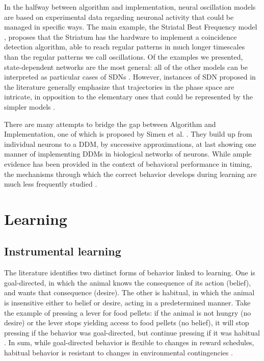     In the halfway between algorithm and implementation, neural oscillation models are based on experimental data regarding neuronal activity that could be managed in specific ways. The main example, the Striatal Beat Frequency model \cite{mello2015scalable}, proposes that the Striatum has the hardware to implement a coincidence detection algorithm, able to reach regular patterns in much longer timescales than the regular patterns we call oscillations. Of the examples we presented, state-dependent networks are the most general: all of the other models can be interpreted as particular cases of SDNs \cite{hass2014neurocomputational}. However, instances of SDN proposed in the literature generally emphasize that trajectories in the phase space are intricate, in opposition to the elementary ones that could be represented by the simpler models \cite{buonomano2009state}.

    There are many attempts to bridge the gap between Algorithm and Implementation, one of which is proposed by Simen et al. \cite{simen2011model}. They build up from individual neurons to a DDM, by successive approximations, at last showing one manner of implementing DDMs in biological networks of neurons. While ample evidence has been provided in the context of behavioral performance in timing, the mechanisms through which the correct behavior develops during learning are much less frequently studied \cite{van20168}. 

\section{Learning}
\label{sec:learning}
    \subsection{Instrumental learning}
        The literature identifies two distinct forms of behavior linked to learning. One is goal-directed, in which the animal knows the consequence of its action (belief), and wants that consequence (desire). The other is habitual, in which the animal is insensitive either to belief or desire, acting in a predetermined manner. Take the example of pressing a lever for food pellets: if the animal is not hungry (no desire) or the lever stops yielding access to food pellets (no belief), it will stop pressing if the behavior was goal-directed, but continue pressing if it was habitual \cite{dickinson2015instrumental}. In sum, while goal-directed behavior is flexible to changes in reward schedules, habitual behavior is resistant to changes in environmental contingencies \cite{dickinson2015instrumental}.
        

